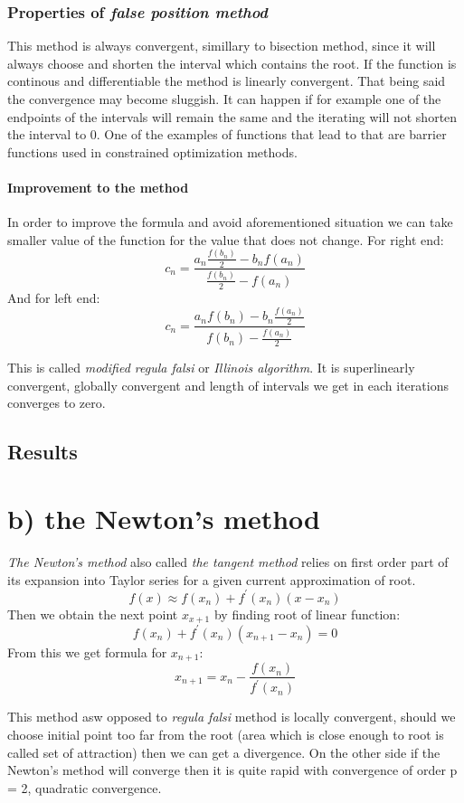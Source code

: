 \documentclass[12pt]{report}
\begin{document}
\subsubsection{Properties of \emph{false position method}}
This method is always convergent, simillary to bisection method, since it will always choose and shorten the interval which contains the root. If the function is continous and differentiable the method is linearly convergent. That being said the convergence may become sluggish. It can happen if for example one of the endpoints of the intervals will remain the same and the iterating will not shorten the interval to 0. One of the examples of functions that lead to that are barrier functions used in constrained optimization methods.

\paragraph{Improvement to the method}
In order to improve the formula and avoid aforementioned situation we can take smaller value of the function for the value that does not change.
For right end:
\[ c_n = \frac{a_n\frac{f(b_n)}{2} - b_nf(a_n)}{\frac{f(b_n)}{2} - f(a_n)} \]
And for left end:
\[ c_n = \frac{a_nf(b_n) - b_n\frac{f(a_n)}{2}}{f(b_n)- \frac{f(a_n)}{2}} \]

This is called \emph{modified regula falsi} or \emph{Illinois algorithm}.
It is superlinearly convergent, globally convergent and length of intervals we get in each iterations converges to zero.
\subsection{Results}

\section{b) the Newton's method}
\emph{The Newton's method} also called \emph{the tangent method} relies on first order part of its expansion into Taylor series for a given current approximation of root.
\[ f(x) \approx f(x_n) + f^{'}(x_n)(x-x_n) \]
Then we obtain the next point $x_{x+1}$ by finding root of linear function:
\[ f(x_n) + f^{'}(x_n)(x_{n+1}-x_n) = 0 \]
From this we get formula for $x_{n+1}$:
\[ x_{n+1} = x_n - \frac{f(x_n)}{f^{'}(x_n)} \]

This method asw opposed to \emph{regula falsi} method is locally convergent, should we choose initial point too far from the root (area which is close enough to root is called set of attraction) then we can get a divergence. On the other side if the Newton's method will converge then it is quite rapid with convergence of order p = 2, quadratic convergence.
\end{document}
